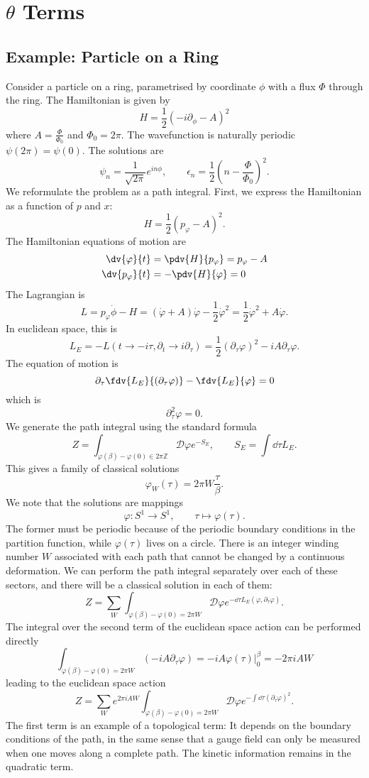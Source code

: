 \documentclass[twoside,symmetric, openany, 12pt]{./tuftebook}
\theoremstyle{definition}
\theoremstyle{definition}
\theoremstyle{definition}
\newcommand{\Z}{\mathbb{Z}}
\begin{document}
\chapter{$\theta$ Terms}
\section{Example: Particle on a Ring}
Consider a particle on a ring, parametrised by coordinate $\phi$ with a flux $\Phi$ through the ring. The Hamiltonian is given by
\[
	H = \frac{1}{2}(-i\partial_\phi - A)^2
\] 
where $A = \frac{\Phi}{\Phi_0}$ and $\Phi_0=2\pi$. The wavefunction is naturally periodic $\psi(2\pi)=\psi(0 )$. The solutions are 
\[
	\psi_n = \frac{1}{\sqrt{2\pi} }e^{in\phi},\qquad \epsilon_n = \frac{1}{2}\left( n - \frac{\Phi}{\Phi_0} \right)^2 
.\] 
We reformulate the problem as a path integral. First, we express the Hamiltonian as a function of $p$ and $x$:
\[
H=\frac{1}{2}(p_\varphi-A)^2
.\] 
The Hamiltonian equations of motion are
\begin{align*}
	\dv{\varphi}{t} &= \pdv{H}{p_\varphi}=p_\varphi - A \\
	\dv{p_\varphi}{t} &= -\pdv{H}{\varphi} = 0
\end{align*}
The Lagrangian is
\[
	L = p_\varphi \dot{\phi} - H = (\dot{\varphi} + A)\dot{\varphi} -\frac{1}{2}\dot{\varphi}^2 = \frac{1}{2}\dot{\varphi}^2 + A\dot{\varphi}
.\] 
In euclidean space, this is
\[
	L_E = -L(t\to -i\tau, \partial_t \to i\partial_\tau) =\frac{1}{2}(\partial_\tau\varphi)^2 -iA\partial_\tau\varphi
.\] 
The equation of motion is
\[
	\partial_\tau \fdv{L_E}{(\partial_\tau\varphi)} - \fdv{L_E}{\varphi} = 0
\] 
which is
\[
\partial_\tau^2 \varphi = 0
.\] 
We generate the path integral using the standard formula
\[
	Z = \int_{\varphi(\beta)-\varphi(0)\in 2\pi \Z} \mathcal{D}\varphi e^{-S_E},\qquad S_E = \int\dd{\tau} L_E
.\] 
This gives a family of classical solutions
\[
\varphi_W(\tau) = 2\pi W \frac{\tau}{\beta}
.\]
We note that the solutions are mappings
\[
\varphi:S^1\to S^1,\qquad \tau\mapsto \varphi(\tau)
.\] 
The former must be periodic because of the periodic boundary conditions in the partition function, while $\varphi(\tau)$ lives on a circle. There is an integer winding number $W$ associated with each path that cannot be changed by a continuous deformation. We can perform the path integral separately over each of these sectors, and there will be a classical solution in each of them:
\[
	Z = \sum_W \int_{\varphi(\beta) - \varphi(0) = 2\pi W} \mathcal{D}\varphi e^{-\dd{\tau}L_E(\varphi, \partial_\tau \varphi)}
.\] 
The integral over the second term of the euclidean space action can be performed directly
\[
	\int_{\varphi(\beta) - \varphi(0)=2\pi W}(-iA\partial_\tau\varphi) = -iA \varphi(\tau)|_0^\beta = -2\pi i A W
\] 
leading to the euclidean space action
\[
	Z = \sum_W e^{2\pi i A W}\int_{\varphi(\beta) - \varphi(0)=2\pi W} \mathcal{D}\varphi e^{-\int \dd{\tau}(\partial_\tau\varphi)^2}
.\] 
The first term is an example of a topological term: It depends on the boundary conditions of the path, in the same sense that a gauge field can only be measured when one moves along a complete path. The kinetic information remains in the quadratic term.
\end{document}
